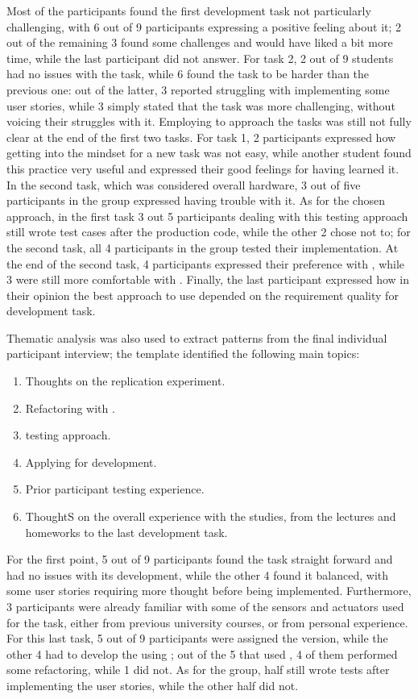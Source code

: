 Most of the participants found the first development task not particularly challenging, with 6 out of 9 participants expressing a positive feeling about it; 2 out of the remaining 3 found some challenges and would have liked a bit more time, while the last participant did not answer. 
For task 2, 2 out of 9 students had no issues with the task, while 6 found the task to be harder than the previous one: out of the latter, 3 reported struggling with implementing some user stories, while 3 simply stated that the task was more challenging, without voicing their struggles with it.
Employing \tdd to approach the tasks was still not fully clear at the end of the first two tasks. For task 1, 2 participants expressed how getting into the \tdd mindset for a new task was not easy, while another student found this practice very useful and expressed their good feelings for having learned it. 
In the second task, which was considered overall hardware, 3 out of five participants in the \tdd group expressed having trouble with it.
As for the chosen \notdd approach, in the first task 3 out 5 participants dealing with this testing approach still wrote test cases after the production code, while the other 2 chose not to; for the second task, all 4 participants in the \notdd group tested their implementation.
At the end of the second task, 4 participants expressed their preference with \tdd, while 3 were still more comfortable with \notdd. Finally, the last participant expressed how in their opinion the best approach to use depended on the requirement quality  for development task.

Thematic analysis was also used to extract patterns from the final individual participant interview; the template identified the following main topics: 
\begin{enumerate}
    \item Thoughts on the replication experiment.
    \item Refactoring with \tdd.
    \item \notdd testing approach.
    \item Applying \tdd for \ess development.
    \item Prior participant testing experience.
    \item ThoughtS on the overall experience with the studies, from the lectures and homeworks to the last development task.
\end{enumerate}

For the first point, 5 out of 9 participants found the task straight forward and had no issues with its development, while the other 4 found it balanced, with some user stories requiring more thought before being implemented. Furthermore, 3 participants were already familiar with some of the sensors and actuators used for the task, either from previous university courses, or from personal experience.
For this last task, 5 out of 9 participants were assigned the \tdd version, while the other 4 had to develop the \es using \notdd; out of the 5 that used \tdd, 4 of them performed some refactoring, while 1 did not. As for the \notdd group, half still wrote tests after implementing the user stories, while the other half did not.

